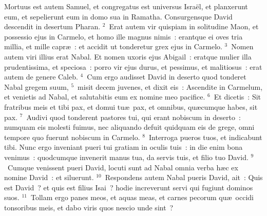 \lettrine[lines=10,image=true,loversize=0.05,lraise=-0.03]{M}{}ortuus est autem Samuel, et congregatus est universus Isra\"el, et planxerunt eum, et sepelierunt eum in domo sua in Ramatha. Consurgensque David descendit in desertum Pharan.
${}^{2}$~Erat autem vir quispiam in solitudine Maon, et possessio ejus in Carmelo, et homo ille magnus nimis~: erantque ei oves tria millia, et mille capr\ae~: et accidit ut tonderetur grex ejus in Carmelo.
${}^{3}$~Nomen autem viri illius erat Nabal. Et nomen uxoris ejus Abigail~: eratque mulier illa prudentissima, et speciosa~: porro vir ejus durus, et pessimus, et malitiosus~: erat autem de genere Caleb.
${}^{4}$~Cum ergo audisset David in deserto quod tonderet Nabal gregem suum,
${}^{5}$~misit decem juvenes, et dixit eis~: Ascendite in Carmelum, et venietis ad Nabal, et salutabitis eum ex nomine meo pacifice.
${}^{6}$~Et dicetis~: Sit fratribus meis et tibi pax, et domui tu\ae\ pax, et omnibus, qu\ae cumque habes, sit pax.
${}^{7}$~Audivi quod tonderent pastores tui, qui erant nobiscum in deserto~: numquam eis molesti fuimus, nec aliquando defuit quidquam eis de grege, omni tempore quo fuerunt nobiscum in Carmelo.
${}^{8}$~Interroga pueros tuos, et indicabunt tibi. Nunc ergo inveniant pueri tui gratiam in oculis tuis~: in die enim bona venimus~: quodcumque invenerit manus tua, da servis tuis, et filio tuo David.
${}^{9}$~Cumque venissent pueri David, locuti sunt ad Nabal omnia verba h\ae c ex nomine David~: et siluerunt.
${}^{10}$~Respondens autem Nabal pueris David, ait~: Quis est David~? et quis est filius Isai~? hodie increverunt servi qui fugiunt dominos suos.
${}^{11}$~Tollam ergo panes meos, et aquas meas, et carnes pecorum qu\ae\ occidi tonsoribus meis, et dabo viris quos nescio unde sint~?


